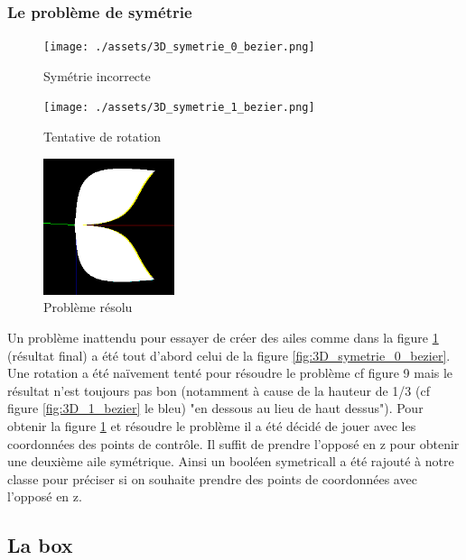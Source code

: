 \documentclass{article}
\begin{document}
\subsubsection{Le problème de symétrie}

\begin{figure}[!htb]
	\centering
	\begin{minipage}{0.3\textwidth}
    	\centering
    	\texttt{[image: ./assets/3D\_symetrie\_0\_bezier.png]}
    	\caption{Symétrie incorrecte}
    	\label{fig:3D_symetrie_0_bezier}
	\end{minipage}
	\begin{minipage}{0.3\textwidth}
    	\centering
    	\texttt{[image: ./assets/3D\_symetrie\_1\_bezier.png]}
    	\caption{Tentative de rotation}
    	\label{fig:3D_symetrie_1_bezier}
	\end{minipage}
	\begin{minipage}{0.3\textwidth}
    	\centering
    	\includegraphics[height=4cm]{./assets/3D_symetrie_2_bezier.png}
    	\caption{Problème résolu}
    	\label{fig:3D_symetrie_2_bezier}
	\end{minipage}
\end{figure}

Un problème inattendu pour essayer de créer des ailes comme dans la figure \ref{fig:3D_symetrie_2_bezier} (résultat final) a été tout d'abord celui de la figure \ref{fig:3D_symetrie_0_bezier}. Une rotation a été naïvement tenté pour résoudre le problème cf figure 9 mais le résultat n'est toujours pas bon (notamment à cause de la hauteur de 1/3 (cf figure \ref{fig:3D_1_bezier} le bleu) "en dessous au lieu de haut dessus"). Pour obtenir la figure \ref{fig:3D_symetrie_2_bezier} et résoudre le problème il a été décidé de jouer avec les coordonnées des points de contrôle. Il suffit de prendre l'opposé en z pour obtenir une deuxième aile symétrique. Ainsi un booléen symetricall a été rajouté à notre classe pour préciser si on souhaite prendre des points de coordonnées avec l'opposé en z. 

\subsection{La box}
	
\end{document}
